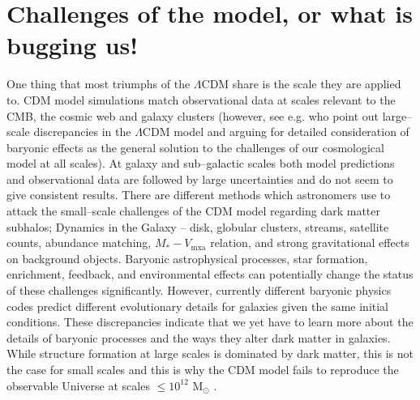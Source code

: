 \documentclass[a4wide,12pt]{book}
\begin{document}
\section{Challenges of the model, or what is bugging us!}
\label{subsec:LCDM_challenges}
One thing that most triumphs of the $\Lambda$CDM share is the scale they are applied to. CDM model simulations match observational data at scales relevant to the CMB, the cosmic web and galaxy clusters (however, see e.g. \citealt{Guo+2011} who point out large--scale discrepancies in the $\Lambda$CDM model and arguing for detailed consideration of baryonic effects as the general solution to the challenges of our cosmological model at all scales). At galaxy and sub--galactic scales both model predictions and observational data are followed by large uncertainties and do not seem to give consistent results. There are different methods which astronomers use to attack the small--scale challenges of the CDM model regarding dark matter subhalos; Dynamics in the Galaxy -- disk, globular clusters, streams, satellite counts, abundance matching, $M_* - V_\mathrm{mxa}$ relation, and strong gravitational effects on background objects. Baryonic astrophysical processes, star formation, enrichment, feedback, and environmental effects can potentially change the status of these challenges significantly. However, currently different baryonic physics codes predict different evolutionary details for galaxies given the same initial conditions. These discrepancies indicate that we yet have to learn more about the details of baryonic processes and the ways they alter dark matter in galaxies. While structure formation at large scales is dominated by dark matter, this is not the case for small scales and this is why the CDM model fails to reproduce the observable Universe at scales $\leq 10^{12} $ $\mathrm{M}_{\odot} $ .
\end{document}
